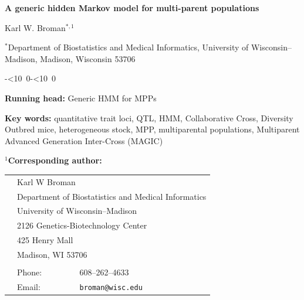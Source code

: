 \documentclass[12pt,letterpaper]{article}\usepackage[]{graphicx}\usepackage[table]{xcolor}
\begin{document}

\vspace*{8mm}
\begin{center}

\textbf{\Large A generic hidden Markov model
for multi-parent populations}

\bigskip \bigskip \bigskip \bigskip

{\large Karl W. Broman$^{*,1}$}

\bigskip \bigskip

$^{*}$Department of Biostatistics and Medical Informatics,
University of Wisconsin--Madison, Madison, Wisconsin 53706

\end{center}

\def\todayISO{\leavevmode\hbox{\the\year-\twodigits\month-\twodigits\day}}
\def\twodigits#1{\ifnum#1<10 0\fi\the#1}

\vspace{3in} \hfill {\footnotesize \todayISO}

\clearpage

\noindent \textbf{Running head:} Generic HMM for MPPs


\bigskip \bigskip \bigskip

\noindent \textbf{Key words:} quantitative trait loci, QTL, HMM,
Collaborative Cross, Diversity Outbred mice, heterogeneous stock, MPP,
multiparental populations, Multiparent Advanced Generation Inter-Cross
(MAGIC)



\bigskip \bigskip \bigskip

\noindent \textbf{$^1$Corresponding author:}

\begin{tabular}{lll}
 \\
 \hspace{1cm} & \multicolumn{2}{l}{Karl W Broman} \\
 & \multicolumn{2}{l}{Department of Biostatistics and Medical Informatics} \\
 & \multicolumn{2}{l}{University of Wisconsin--Madison} \\
 & \multicolumn{2}{l}{2126 Genetics-Biotechnology Center} \\
 & \multicolumn{2}{l}{425 Henry Mall} \\
 & \multicolumn{2}{l}{Madison, WI 53706} \\
 \\
 & Phone: & 608--262--4633 \\
 & Email: & \verb|broman@wisc.edu|
\end{tabular}
\end{document}
